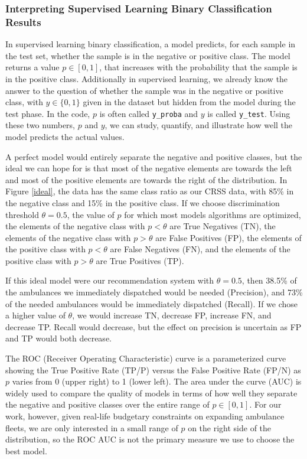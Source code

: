 \subsubsection{Interpreting Supervised Learning Binary Classification Results}
\label{interpreting_ideal}

In supervised learning binary classification, a model predicts, for each sample in the test set, whether the sample is in the negative or positive class.  The model returns a value $p \in [0,1]$, that increases with the probability that the sample is in the positive class.  Additionally in supervised learning, we already know the answer to the question of whether the sample was in the negative or positive class, with $y \in \{0,1\}$ given in the dataset but hidden from the model during the test phase.  In the code, $p$ is often called \verb|y_proba| and $y$ is called \verb|y_test|.  Using these two numbers, $p$ and $y$, we can study, quantify, and illustrate how well the model predicts the actual values.  

A perfect model would entirely separate the negative and positive classes, but the ideal we can hope for is that most of the negative elements are towards the left and most of the positive elements are towards the right of the distribution.  In Figure \ref{ideal}, the data has the same class ratio as our CRSS data, with 85\% in the negative class and 15\% in the positive class.  If we choose discrimination threshold $\theta = 0.5$, the value of $p$ for which most models algorithms are optimized, the elements of the negative class with $p<\theta$ are True Negatives (TN), the elements of the negative class with $p > \theta$ are False Positives (FP), the elements of the positive class with $p < \theta$ are False Negatives (FN), and the elements of the positive class with $p > \theta$ are True Positives (TP).  

If this ideal model were our recommendation system with $\theta = 0.5$, then 38.5\% of the ambulances we immediately dispatched would be needed (Precision), and 73\% of the needed ambulances would be immediately dispatched (Recall).  If we chose a higher value of $\theta$, we would increase TN, decrease FP, increase FN, and decrease TP.  Recall would decrease, but the effect on precision is uncertain as FP and TP would both decrease.

The ROC (Receiver Operating Characteristic) curve is a parameterized curve showing the True Positive Rate (TP/P) versus the False Positive Rate (FP/N) as $p$ varies from 0 (upper right) to 1 (lower left).  The area under the curve (AUC) is widely used to compare the quality of models in terms of how well they separate the negative and positive classes over the entire range of $p \in [0,1]$.  For our work, however, given real-life budgetary constraints on expanding ambulance fleets, we are only interested in a small range of $p$ on the right side of the distribution, so the ROC AUC is not the primary measure we use to choose the best model.

